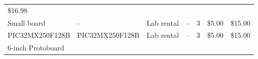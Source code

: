 \documentclass[]{article}
\begin{document}
\begin{longtable}[]{@{}lllllll@{}}
\begin{minipage}[t]{0.07\columnwidth}
\$16.98\strut
\end{minipage}\tabularnewline
\begin{minipage}[t]{0.15\columnwidth}\raggedright
Small board\strut
\end{minipage} & \begin{minipage}[t]{0.15\columnwidth}\raggedright
--\strut
\end{minipage} & \begin{minipage}[t]{0.10\columnwidth}\raggedright
Lab rental\strut
\end{minipage} & \begin{minipage}[t]{0.17\columnwidth}\raggedright
--\strut
\end{minipage} & \begin{minipage}[t]{0.11\columnwidth}\raggedright
3\strut
\end{minipage} & \begin{minipage}[t]{0.06\columnwidth}\raggedright
\$5.00\strut
\end{minipage} & \begin{minipage}[t]{0.07\columnwidth}\raggedright
\$15.00\strut
\end{minipage}\tabularnewline
\begin{minipage}[t]{0.15\columnwidth}\raggedright
PIC32MX250F128B\strut
\end{minipage} & \begin{minipage}[t]{0.15\columnwidth}\raggedright
PIC32MX250F128B\strut
\end{minipage} & \begin{minipage}[t]{0.10\columnwidth}\raggedright
Lab rental\strut
\end{minipage} & \begin{minipage}[t]{0.17\columnwidth}\raggedright
--\strut
\end{minipage} & \begin{minipage}[t]{0.11\columnwidth}\raggedright
3\strut
\end{minipage} & \begin{minipage}[t]{0.06\columnwidth}\raggedright
\$5.00\strut
\end{minipage} & \begin{minipage}[t]{0.07\columnwidth}\raggedright
\$15.00\strut
\end{minipage}\tabularnewline
\begin{minipage}[t]{0.15\columnwidth}\raggedright
6-inch Protoboard\strut
\end{minipage} & \begin{minipage}[t]{0.15\columnwidth}\raggedright

\end{minipage}
\end{longtable}
\end{document}

